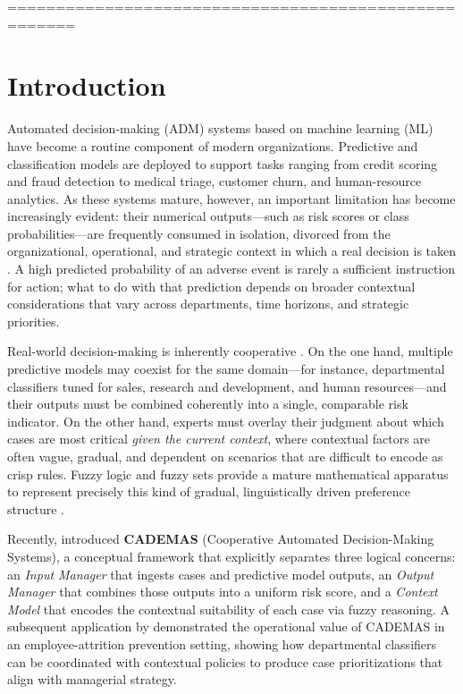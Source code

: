 =====================================================
\section{Introduction}\label{sec:intro}

Automated decision-making (ADM) systems based on machine learning (ML) have become a routine
component of modern organizations. Predictive and classification models are deployed to support
tasks ranging from credit scoring and fraud detection to medical triage, customer churn, and
human-resource analytics. As these systems mature, however, an important limitation has become
increasingly evident: their numerical outputs---such as risk scores or class
probabilities---are frequently consumed in isolation, divorced from the organizational,
operational, and strategic context in which a real decision is taken
\citep{tariq2024a2c,varga2023cooperative}. A high predicted probability of an adverse event is
rarely a sufficient instruction for action; what to do with that prediction depends on broader
contextual considerations that vary across departments, time horizons, and strategic priorities.

Real-world decision-making is inherently cooperative \citep{tariq2024a2c}. On the one hand,
multiple predictive models may coexist for the same domain---for instance, departmental
classifiers tuned for sales, research and development, and human resources---and their outputs
must be combined coherently into a single, comparable risk indicator. On the other hand, experts
must overlay their judgment about which cases are most critical \emph{given the current context},
where contextual factors are often vague, gradual, and dependent on scenarios that are difficult
to encode as crisp rules. Fuzzy logic and fuzzy sets provide a mature mathematical apparatus to
represent precisely this kind of gradual, linguistically driven preference structure
\citep{kumar2025fuzzy,ghosh2020fuzzydss}.

Recently, \citet{novoa2026cademas} introduced \textbf{CADEMAS} (Cooperative Automated
Decision-Making Systems), a conceptual framework that explicitly separates three logical
concerns: an \emph{Input Manager} that ingests cases and predictive model outputs, an
\emph{Output Manager} that combines those outputs into a uniform risk score, and a
\emph{Context Model} that encodes the contextual suitability of each case via fuzzy reasoning.
A subsequent application by \citet{godz2026attrition} demonstrated the operational value of
CADEMAS in an employee-attrition prevention setting, showing how departmental classifiers can be
coordinated with contextual policies to produce case prioritizations that align with managerial
strategy.

